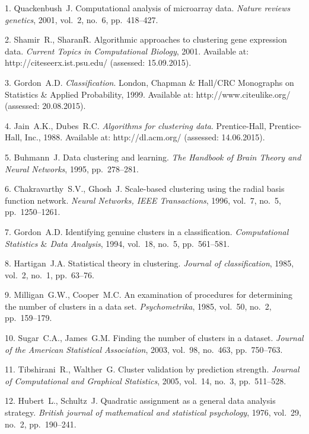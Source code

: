

{\footnotesize

\vskip 3mm


\vskip 2mm

1. Quackenbush~J. Computational analysis of microarray data. {\it
Nature reviews genetics}, 2001, vol.~2, no.~6, pp.~418--427.

2. Shamir~R., Sharan\:R. Algorithmic approaches to clustering gene
expression data. {\it Current Topics in Computational Biology},
2001. Available at: http://citeseerx.ist.psu.edu/ (assessed:
15.09.2015).

3. Gordon~A.\:D. {\it Classification}. London, Chapman \& Hall/CRC
Monographs on Statistics \& Applied Probability, 1999. Available
at: http://www.citeulike.org/ (assessed: 20.08.2015).

4. Jain~A.\:K., Dubes~R.\:C. {\it Algorithms for clustering data}.
Prentice-Hall, Prentice-Hall, Inc., 1988. Available at:
http://dl.acm.org/ (assessed: 14.06.2015).

5. Buhmann~J. Data clustering and learning. {\it The Handbook of
Brain Theory and Neural Networks}, 1995, pp.~278--281.

6. Chakravarthy~S.\:V., Ghosh~J. Scale-based clustering using the
radial basis function network. {\it Neural Networks, IEEE
Transactions}, 1996, vol.~7, no.~5, pp.~1250--1261.

7. Gordon~A.\:D. Identifying genuine clusters in a classification.
{\it Computational Statistics $\&$ Data Analysis}, 1994, vol.~18,
no.~5, pp.~561--581.

8. Hartigan~J.\:A. Statistical theory in clustering. {\it Journal
of classification}, 1985, vol.~2, no.~1, pp.~63--76.

9. Milligan~G.\:W., Cooper~M.\:C. An examination of procedures for
determining the number of clusters in a data set. {\it
Psychometrika}, 1985, vol.~50, no.~2, pp.~159--179.

10. Sugar~C.\:A., James~G.\:M. Finding the number of clusters in a
dataset. {\it Journal of the American Statistical Association},
2003, vol.~98, no.~463, pp.~750--763.

11. Tibshirani~R., Walther~G. Cluster validation by prediction
strength. {\it Journal of Computational and Graphical Statistics},
2005, vol.~14, no.~3, pp.~511--528.

12. Hubert~L., Schultz~J. Quadratic assignment as a general data
analysis strategy. {\it British journal of mathematical and
statistical psychology}, 1976, vol.~29, no.~2, pp.~190--241.

}
